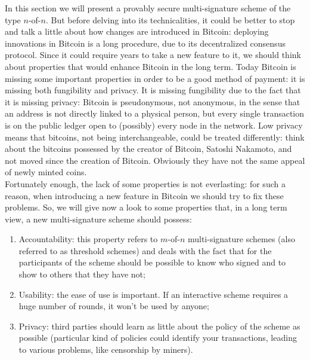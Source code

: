 \bigskip
\noindent
In this section we will present a provably secure multi-signature scheme of the type $n$-of-$n$. But before delving into its technicalities, it could be better to stop and talk a little about how changes are introduced in Bitcoin: deploying innovations in Bitcoin is a long procedure, due to its decentralized consensus protocol. Since it could require years to take a new feature to it, we should think about properties that would enhance Bitcoin in the long term. Today Bitcoin is missing some important properties in order to be a good method of payment: it is missing both fungibility and privacy. It is missing fungibility due to the fact that it is missing privacy: Bitcoin is pseudonymous, not anonymous, in the sense that an address is not directly linked to a physical person, but every single transaction is on the public  ledger open to (possibly) every node in the network. Low privacy means that bitcoins, not being interchangeable, could be treated differently: think about the bitcoins possessed by the creator of Bitcoin, Satoshi Nakamoto, and not moved since the creation of Bitcoin. Obviously they have not the same appeal of newly minted coins.
\\
Fortunately enough, the lack of some properties is not everlasting: for such a reason, when introducing a new feature in Bitcoin we should try to fix these problems. So, we will give now a look to some properties that, in a long term view, a new multi-signature scheme should possess:
\begin{enumerate}
	\item Accountability: this property refers to $m$-of-$n$ multi-signature schemes (also referred to as threshold schemes) and deals with the fact that for the participants of the scheme should be possible to know who signed and to show to others that they have not;
	\item Usability: the ease of use is important. If an interactive scheme requires a huge number of rounds, it won't be used by anyone;
	\item Privacy: third parties should learn as little about the policy of the scheme as possible (particular kind of policies could identify your transactions, leading to various problems, like censorship by miners).
\end{enumerate}

